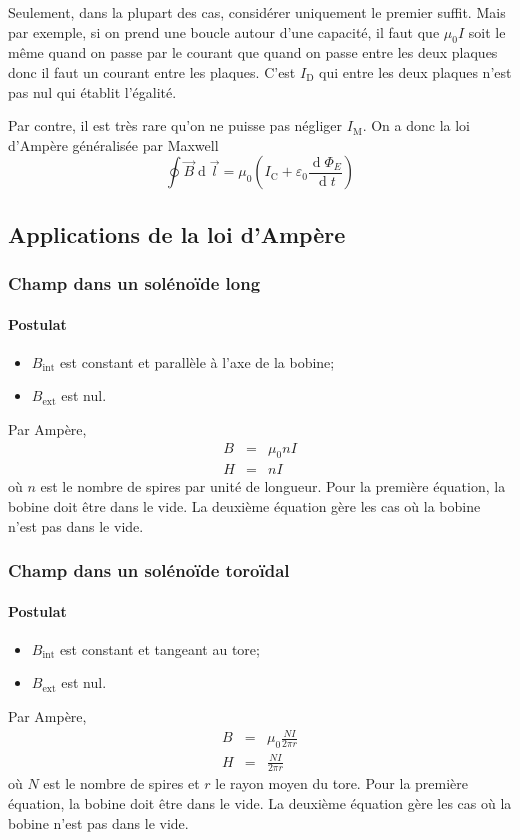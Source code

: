 \documentclass[11pt,a4paper]{article}
\newcommand{\B}{\vec B}
\DeclareMathOperator{\diff}{d}
\newcommand{\dif}{\diff\!}
\begin{document}
Seulement, dans la plupart des cas, considérer uniquement le premier suffit.
Mais par exemple, si on prend une boucle autour d'une capacité,
il faut que $\mu_0I$ soit le même quand on passe par le courant que quand on passe entre les deux plaques donc il faut un courant entre les plaques.
C'est $I_\mathrm{D}$ qui entre les deux plaques n'est pas nul qui établit l'égalité.

Par contre, il est très rare qu'on ne puisse pas négliger $I_\mathrm{M}$.
On a donc la loi d'Ampère généralisée par Maxwell
\[ \oint \B \dif \vec l = \mu_0 \left(I_\mathrm{C} + \varepsilon_0 \frac{\dif \Phi_E}{\dif t}\right) \]

\subsection{Applications de la loi d'Ampère}
\subsubsection{Champ dans un solénoïde long}
\label{sec:bbl}
\paragraph{Postulat}
\begin{itemize}
	\item $B_\mathrm{int}$ est constant et parallèle à l'axe de la bobine;
	\item $B_\mathrm{ext}$ est nul.
\end{itemize}
Par Ampère,
\begin{eqnarray*}
	B &=& \mu_0nI\\
	H &=& nI
\end{eqnarray*}
où $n$ est le nombre de spires par unité de longueur.
Pour la première équation, la bobine doit être dans le vide.
La deuxième équation gère les cas où la bobine n'est pas dans le vide.

\subsubsection{Champ dans un solénoïde toroïdal}
\label{sec:bst}
\paragraph{Postulat}
\begin{itemize}
	\item $B_\mathrm{int}$ est constant et tangeant au tore;
	\item $B_\mathrm{ext}$ est nul.
\end{itemize}
Par Ampère,
\begin{eqnarray*}
	B &=& \mu_0\frac{NI}{2\pi r}\\
	H &=& \frac{NI}{2\pi r}
\end{eqnarray*}
où $N$ est le nombre de spires et $r$ le rayon moyen du tore.
Pour la première équation, la bobine doit être dans le vide.
La deuxième équation gère les cas où la bobine n'est pas dans le vide.
\end{document}
